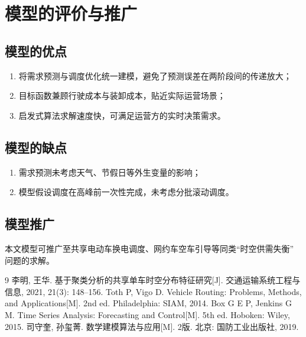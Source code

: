 \documentclass[zihao=-4,a4paper]{ctexart}
\begin{document}
\section{模型的评价与推广}

\subsection{模型的优点}

\begin{enumerate}
  \item 将需求预测与调度优化统一建模，避免了预测误差在两阶段间的传递放大；
  \item 目标函数兼顾行驶成本与装卸成本，贴近实际运营场景；
  \item 启发式算法求解速度快，可满足运营方的实时决策需求。
\end{enumerate}

\subsection{模型的缺点}

\begin{enumerate}
  \item 需求预测未考虑天气、节假日等外生变量的影响；
  \item 模型假设调度在高峰前一次性完成，未考虑分批滚动调度。
\end{enumerate}

\subsection{模型推广}

\quad 本文模型可推广至共享电动车换电调度、网约车空车引导等同类“时空供需失衡”
问题的求解。

\begin{thebibliography}{9}
   李明, 王华. 基于聚类分析的共享单车时空分布特征研究[J].
    交通运输系统工程与信息, 2021, 21(3): 148--156.
   Toth P, Vigo D. Vehicle Routing: Problems, Methods, and
    Applications[M]. 2nd ed. Philadelphia: SIAM, 2014.
   Box G E P, Jenkins G M. Time Series Analysis: Forecasting
    and Control[M]. 5th ed. Hoboken: Wiley, 2015.
   司守奎, 孙玺菁. 数学建模算法与应用[M]. 2版. 北京: 国防工业出版社, 2019.
\end{thebibliography}
\end{document}
